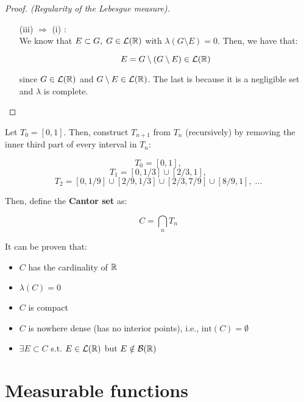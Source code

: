 \begin{proof}[Proof. (Regularity of the Lebesgue measure)]
\begin{enumerate}
        Then, $G$ is a $G_{\delta}$ set, $E \subset G$ and:

        $$ 0 \leq \lambda^{*}(G \setminus E) \leq \lambda^{*}(A_n \setminus E) < 1/n$$

        Taking the limit, we have that $\lambda(G \setminus E) = 0$.

        \item[(iii) $\Rightarrow$ (i)]: \\
        
        We know that $E \subset G, \; G \in \mathcal{L}(\mathbb{R})$ with $\lambda(G \setminus E) = 0$. 
        Then, we have that:

        $$ E = G \setminus (G \setminus E) \in \mathcal{L}(\mathbb{R})$$

        since $G \in \mathcal{L}(\mathbb{R})$ and $G \setminus E \in \mathcal{L}(\mathbb{R})$. The last is 
        because it is a negligible set and $\lambda$ is complete.

    \end{enumerate}
    
\end{proof}

\begin{fexample}
    Let $T_0 = [0, 1]$. Then, construct $T_{n+1}$ from $T_n$ (recursively) by removing the
    inner third part of every interval in $T_n$:

    $$T_0 = [0, 1], $$
    $$T_1 = [0, 1/3] \cup [2/3, 1],$$
    $$T_2 = [0, 1/9] \cup [2/9, 1/3] \cup [2/3, 7/9] \cup [8/9, 1], \; ...$$


    Then, define the \textbf{Cantor set} as:

    $$C = \bigcap_{n} T_n$$

    It can be proven that:
    \begin{itemize}
        \item $C$ has the cardinality of $\mathbb{R}$
        \item $\lambda(C) = 0$
        \item $C$ is compact
        \item $C$ is nowhere dense (has no interior points), i.e., $\text{int}(C) = \emptyset$
        \item $\exists E \subset C$ s.t. $E \in \mathcal{L}(\mathbb{R})$ but $E \notin \mathcal{B}(\mathbb{R})$
    \end{itemize}
    
\end{fexample}

\section{Measurable functions}

